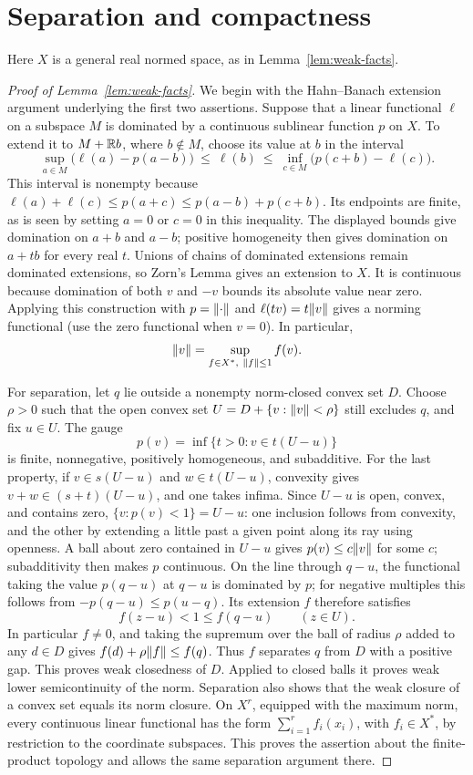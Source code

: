 \section{Separation and compactness}\label{app:foundations}

Here $X$ is a general real normed space, as in Lemma~\ref{lem:weak-facts}.

\begin{proof}[Proof of Lemma~\ref{lem:weak-facts}]
We begin with the Hahn--Banach extension argument underlying the first two assertions.
Suppose that a linear functional $\ell$ on a subspace $M$ is dominated by a
continuous sublinear function $p$ on $X$. To extend it to $M+\mathbb R b$, where
$b\notin M$, choose its value at $b$ in the interval
\[
 \sup_{a\in M}\bigl(\ell(a)-p(a-b)\bigr)
 \ \leq\ \ell(b)\ \leq\
 \inf_{c\in M}\bigl(p(c+b)-\ell(c)\bigr).
\]
This interval is nonempty because
$\ell(a)+\ell(c)\leq p(a+c)\leq p(a-b)+p(c+b)$.
Its endpoints are finite, as is seen by setting $a=0$ or $c=0$ in this
inequality. The displayed bounds give domination on $a+b$ and $a-b$;
positive homogeneity then gives domination on $a+tb$ for every real $t$.
Unions of chains of dominated extensions remain dominated extensions, so
Zorn's Lemma gives an extension to $X$. It is continuous because domination
of both $v$ and $-v$ bounds its absolute value near zero.
Applying this construction with $p=\lVert\cdot\rVert$ and
$\ell(tv)=t\lVert v\rVert$ gives a norming functional (use the zero functional
when $v=0$). In particular,
\[
             \norm{v}=\sup_{f\in X^*,\ \norm{f}\leq1}f(v).
\]

For separation, let $q$ lie outside a nonempty norm-closed convex set $D$.
Choose $\rho>0$ such that the open convex set
$U=D+\{v:\lVert v\rVert<\rho\}$ still excludes $q$, and fix $u\in U$.
The gauge
\[
 p(v)=\inf\{t>0:v\in t(U-u)\}
\]
is finite, nonnegative, positively homogeneous, and subadditive.
For the last property, if $v\in s(U-u)$ and $w\in t(U-u)$, convexity gives
$v+w\in(s+t)(U-u)$, and one takes infima.
Since $U-u$ is open, convex, and contains zero, $\{v:p(v)<1\}=U-u$:
one inclusion follows from convexity, and the other by extending a little
past a given point along its ray using openness.
A ball about zero contained in $U-u$ gives $p(v)\leq c\lVert v\rVert$ for some
$c$; subadditivity then makes $p$ continuous.
On the line through $q-u$, the functional taking the value $p(q-u)$ at
$q-u$ is dominated by $p$; for negative multiples this follows from
$-p(q-u)\leq p(u-q)$. Its extension $f$ therefore satisfies
\[
             f(z-u)<1\leq f(q-u)\qquad(z\in U).
\]
In particular $f\ne0$, and taking the supremum over the ball of radius
$\rho$ added to any $d\in D$ gives
$f(d)+\rho\lVert f\rVert\leq f(q)$. Thus $f$ separates $q$ from $D$ with a
positive gap. This proves weak closedness of $D$. Applied to closed balls
it proves weak lower semicontinuity of the norm. Separation also shows
that the weak closure of a convex set equals its norm closure.
On $X^r$, equipped with the maximum norm, every continuous linear
functional has the form $\sum_{i=1}^r f_i(x_i)$, with $f_i\in X^*$,
by restriction to the coordinate subspaces. This proves the assertion
about the finite-product topology and allows the same separation argument
there.


\end{proof}
